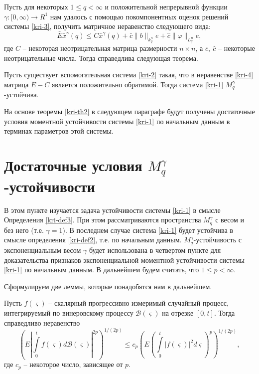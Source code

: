 Пусть для некоторых $1\le q < \infty $ и положительной непрерывной
функции $\gamma :[0, \infty) \rightarrow R^1 $ нам удалось с помощью
покомпонентных оценок решений системы \eqref{kri-3}, получить матричное
неравенство следующего вида:
\begin{equation}\label{kri-4}
\bar E\bar x^\gamma (q) \leq C\bar x^\gamma (q) + \bar
c\|b\|_{k^n_{q}}e + \hat c \|\varphi \|_{L^n_q} e,
\end{equation}
где $C$ -- некоторая неотрицательная матрица размерности $n\times
n$, а $\bar c, \ \hat c$ -- некоторые неотрицательные числа. Тогда
справедлива следующая теорема.

\begin{theorem}\label{kri-th2} Пусть существует вспомогательная система
\eqref{kri-2} такая, что в неравенстве \eqref{kri-4} матрица $\bar E - C$ является
положительно обратимой. Тогда система \eqref{kri-1} $M_q^\gamma$-устой\-чи\-ва.
\end{theorem}

На основе теоремы \ref{kri-th2} в следующем параграфе будут получены достаточные
условия моментной устойчивости системы \eqref{kri-1} по начальным данным в
терминах параметров этой системы.

\section{Достаточные условия \texorpdfstring{$M_q^\gamma$}{Mq}-устойчивости}

В этом
пункте изучается задача устойчивости системы \eqref{kri-1} в смысле
Определения \ref{kri-def3}. При этом рассматриваются пространства  $M_q^\gamma$ с
весом и без него (т.е. $\gamma=1$). В последнем случае система \eqref{kri-1}
будет устойчива в смысле определения \ref{kri-def2}, т.е. по начальным данным.
$M_q^\gamma$-устойчивость с экспоненциальным весом $\gamma$ будет
использована в четвертом пункте для доказательства признаков
экспоненциальной моментной устойчивости системы \eqref{kri-1} по начальным
данным. В дальнейшем будем считать, что $1 \leq p < \infty $.

Сформулируем две леммы, которые понадобятся нам в дальнейшем.

\begin{lemma}\label{kri-lem2} Пусть $f(\varsigma )$ -- скалярный прогрессивно
измеримый  случайный процесс, интегрируемый по винеровскому процессу
$\mathcal B(\varsigma)$ на отрезке $[0, t]$. Тогда справедливо
неравенство
\begin{equation}\label{kri-6}
\left(E\left|\int \limits _0^tf(\varsigma )d\mathcal B(\varsigma
)\right|^{2p}\right)^{1/(2p)} \leq c_p \left(E\left(\int \limits
_0^t|f(\varsigma )|^2d\varsigma\right)^p\right)^{1/(2p)},
\end{equation}
где $c_p$ -- некоторое число, зависящее от $p$.
\end{lemma}

